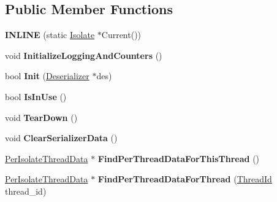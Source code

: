 \subsection*{Public Member Functions}
\begin{DoxyCompactItemize}
\item 
{\bfseries I\+N\+L\+I\+NE} (static \hyperlink{classv8_1_1internal_1_1_isolate}{Isolate} $\ast$Current())\hypertarget{classv8_1_1internal_1_1_isolate_acb7ecce9f1c6ded72f0b29ab37716733}{}\label{classv8_1_1internal_1_1_isolate_acb7ecce9f1c6ded72f0b29ab37716733}

\item 
void {\bfseries Initialize\+Logging\+And\+Counters} ()\hypertarget{classv8_1_1internal_1_1_isolate_a85f6b664b0d7c6c8d93f8ded43cafb7f}{}\label{classv8_1_1internal_1_1_isolate_a85f6b664b0d7c6c8d93f8ded43cafb7f}

\item 
bool {\bfseries Init} (\hyperlink{classv8_1_1internal_1_1_deserializer}{Deserializer} $\ast$des)\hypertarget{classv8_1_1internal_1_1_isolate_ad080de17991f7a18266f434d73c7bf97}{}\label{classv8_1_1internal_1_1_isolate_ad080de17991f7a18266f434d73c7bf97}

\item 
bool {\bfseries Is\+In\+Use} ()\hypertarget{classv8_1_1internal_1_1_isolate_a3bcf3323c5c0f0d0a2a94ff614db8be6}{}\label{classv8_1_1internal_1_1_isolate_a3bcf3323c5c0f0d0a2a94ff614db8be6}

\item 
void {\bfseries Tear\+Down} ()\hypertarget{classv8_1_1internal_1_1_isolate_a63ae213ac973bf2904654138bbcddb85}{}\label{classv8_1_1internal_1_1_isolate_a63ae213ac973bf2904654138bbcddb85}

\item 
void {\bfseries Clear\+Serializer\+Data} ()\hypertarget{classv8_1_1internal_1_1_isolate_ae33e1a45878190f15eece8c2281af1d3}{}\label{classv8_1_1internal_1_1_isolate_ae33e1a45878190f15eece8c2281af1d3}

\item 
\hyperlink{classv8_1_1internal_1_1_isolate_1_1_per_isolate_thread_data}{Per\+Isolate\+Thread\+Data} $\ast$ {\bfseries Find\+Per\+Thread\+Data\+For\+This\+Thread} ()\hypertarget{classv8_1_1internal_1_1_isolate_a67b9b549f88af4e2e59ccd65694a9c3b}{}\label{classv8_1_1internal_1_1_isolate_a67b9b549f88af4e2e59ccd65694a9c3b}

\item 
\hyperlink{classv8_1_1internal_1_1_isolate_1_1_per_isolate_thread_data}{Per\+Isolate\+Thread\+Data} $\ast$ {\bfseries Find\+Per\+Thread\+Data\+For\+Thread} (\hyperlink{classv8_1_1internal_1_1_thread_id}{Thread\+Id} thread\+\_\+id)\hypertarget{classv8_1_1internal_1_1_isolate_a0038635b49c04ad3f746c0d6d149da4a}{}\label{classv8_1_1internal_1_1_isolate_a0038635b49c04ad3f746c0d6d149da4a}


\end{DoxyCompactItemize}
